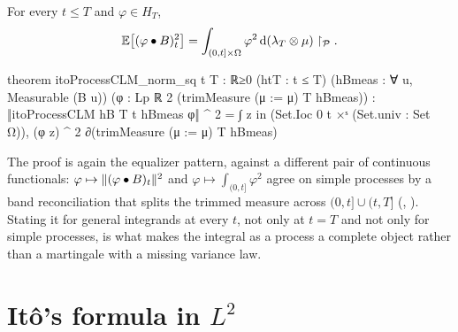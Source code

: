 \documentclass[11pt]{article}
\newcommand{\HT}{H_T}
\newcommand{\bulletB}{\mathbin{\bullet}}
\begin{document}
\begin{theorem}
For every $t\le T$ and $\varphi\in\HT$,
\[
  \E\bigl[(\varphi\bulletB B)_t^2\bigr]=\int_{(0,t]\times\Omega}\varphi^2\,\dd(\lambda_T\otimes\mu)\restriction_{\mathcal P}.
\]
\end{theorem}

\begin{leancode}[caption={The time-indexed It\^o isometry (\texttt{Foundations/ItoIntegralProcessIsometry}).},label=lst:timeiso]
theorem itoProcessCLM_norm_sq {t T : ℝ≥0} (htT : t ≤ T) (hBmeas : ∀ u, Measurable (B u))
    (φ : Lp ℝ 2 (trimMeasure (μ := μ) T hBmeas)) :
    ‖itoProcessCLM hB T t hBmeas φ‖ ^ 2
      = ∫ z in (Set.Ioc 0 t ×ˢ (Set.univ : Set Ω)), (φ z) ^ 2
          ∂(trimMeasure (μ := μ) T hBmeas)
\end{leancode}

The proof is again the equalizer pattern, against a different pair of continuous functionals:
$\varphi\mapsto\norm{(\varphi\bulletB B)_t}^2$ and $\varphi\mapsto\int_{(0,t]}\varphi^2$ agree on simple
processes by a band reconciliation that splits the trimmed measure across $(0,t]\cup(t,T]$
(, ). Stating it for general
integrands at every $t$, not only at $t=T$ and not only for simple processes, is what makes the integral
as a process a complete object rather than a martingale with a missing variance law.

\section{It\^o's formula in \texorpdfstring{$L^2$}{L2}}\label{sec:ito}
\end{document}

